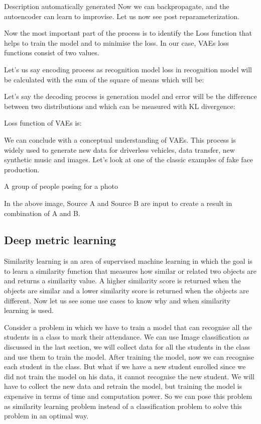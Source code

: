 Description automatically generated
Now we can backpropagate, and the autoencoder can learn to improvise. Let us now see post reparameterization.


Now the most important part of the process is to identify the Loss function that helps to train the model and to minimise the loss. In our case, VAEs loss functions consist of two values.

Let’s us say encoding process as recognition model loss in recognition model will be calculated with the sum of the square of means which will be:


Let’s say the decoding process is generation model and error will be the difference between two distributions and which can be measured with KL divergence: 


Loss function of VAEs is:


We can conclude with a conceptual understanding of VAEs. This process is widely used to generate new data for driverless vehicles, data transfer, new synthetic music and images.  Let’s look at one of the classic examples of fake face production. 

A group of people posing for a photo

In the above image, Source A and Source B are input to create a result in combination of A and B. 


\subsection{Deep metric learning}

Similarity learning is an area of supervised machine learning in which the goal is to learn a similarity function that measures how similar or related two objects are and returns a similarity value. A higher similarity score is returned when the objects are similar and a lower similarity score is returned when the objects are different. Now let us see some use cases to know why and when similarity learning is used.

Consider a problem in which we have to train a model that can recognise all the students in a class to mark their attendance. We can use Image classification as discussed in the last section, we will collect data for all the students in the class and use them to train the model. After training the model, now we can recognise each student in the class. But what if we have a new student enrolled since we did not train the model on his data, it cannot recognise the new student. We will have to collect the new data and retrain the model, but training the model is expensive in terms of time and computation power. So we can pose this problem as similarity learning problem instead of a classification problem to solve this problem in an optimal way.

